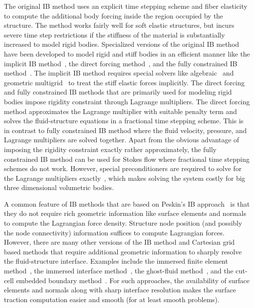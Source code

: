 \documentclass[review]{elsarticle}
\begin{document}
The original IB method uses an
explicit time stepping scheme and fiber elasticity 
to compute the additional body forcing inside 
the region occupied by the structure. The method works fairly well 
for soft elastic structures, but incurs severe time step restrictions 
if the stiffness of the material is substantially increased to model 
rigid bodies. Specialized versions of the original IB method have 
been developed to model rigid and stiff bodies in an efficient manner 
like the implicit IB method~\cite{NewrenEtAl07,Newren08,RDGuy12,Bhalla16,Mori08}, 
the direct forcing method~\cite{Uhlmann05,Bhalla13,Bhalla14}, and the 
fully constrained IB method~\cite{Taira07,Kallemov16,Usabiaga17}. The 
implicit IB method requires special solvers like algebraic~\cite{Ceniceros09} 
and geometric multigrid~\cite{NewrenEtAl07,Bhalla16} to treat the stiff 
elastic forces implicitly. The direct forcing and fully constrained IB 
methods that are primarily used for modeling rigid bodies impose 
rigidity constraint through Lagrange multipliers. The direct forcing 
method approximates the Lagrange multiplier with suitable 
penalty term and solves the fluid-structure equations in a fractional 
time stepping scheme. This is in contrast to fully constrained IB 
method where the fluid velocity, pressure, and Lagrange 
multipliers are solved together. Apart from
the obvious advantage of imposing the rigidity constraint exactly rather
approximately, the fully constrained IB method can be used for Stokes 
flow where fractional time stepping schemes do not work. However,
special preconditioners are required to solve for the Lagrange multipliers
exactly~\cite{Kallemov16,Usabiaga17}, which makes solving the system 
costly for big three dimensional volumetric bodies. 

A common feature of IB methods that are based on Peskin's IB 
approach~\cite{Peskin02} is that they do not require rich geometric 
information like surface elements and normals to compute the 
Lagrangian force density. Structure node position 
(and possibly the node connectivity) information suffices 
to compute Lagrangian forces. However, there 
are many other versions of the IB method and Cartesian grid 
based methods that require additional geometric information to 
sharply resolve the fluid-structure interface.
Examples include the immersed finite element method~\cite{LZhang04,WKLiu06,Heltai12,Griffith17}, 
the immersed interface method~\cite{LaiLi01,LiLai01}, 
the ghost-fluid method~\cite{YHTseng03}, and the cut-cell embedded 
boundary method~\cite{RMittal08,Uday01,Treb15}. For such approaches, 
the availability of surface elements and normals along with sharp 
interface resolution makes the surface traction computation easier 
and smooth (for at least smooth problems). 
\end{document}

